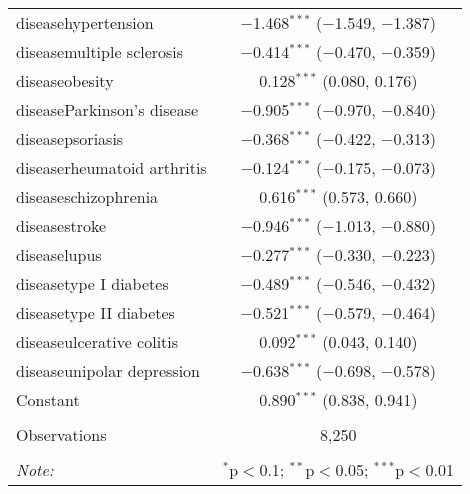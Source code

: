 \begin{table}[!htbp]
\begin{tabular}{@{\extracolsep{5pt}}lc}
  diseasehypertension & $-$1.468$^{***}$ ($-$1.549, $-$1.387) \\ 
  diseasemultiple sclerosis & $-$0.414$^{***}$ ($-$0.470, $-$0.359) \\ 
  diseaseobesity & 0.128$^{***}$ (0.080, 0.176) \\ 
  diseaseParkinson's disease & $-$0.905$^{***}$ ($-$0.970, $-$0.840) \\ 
  diseasepsoriasis & $-$0.368$^{***}$ ($-$0.422, $-$0.313) \\ 
  diseaserheumatoid arthritis & $-$0.124$^{***}$ ($-$0.175, $-$0.073) \\ 
  diseaseschizophrenia & 0.616$^{***}$ (0.573, 0.660) \\ 
  diseasestroke & $-$0.946$^{***}$ ($-$1.013, $-$0.880) \\ 
  diseaselupus & $-$0.277$^{***}$ ($-$0.330, $-$0.223) \\ 
  diseasetype I diabetes & $-$0.489$^{***}$ ($-$0.546, $-$0.432) \\ 
  diseasetype II diabetes & $-$0.521$^{***}$ ($-$0.579, $-$0.464) \\ 
  diseaseulcerative colitis & 0.092$^{***}$ (0.043, 0.140) \\ 
  diseaseunipolar depression & $-$0.638$^{***}$ ($-$0.698, $-$0.578) \\ 
  Constant & 0.890$^{***}$ (0.838, 0.941) \\ 
 \hline \\[-1.8ex] 
Observations & 8,250 \\ 
\hline 
\hline \\[-1.8ex] 
\textit{Note:}  & \multicolumn{1}{r}{$^{*}$p$<$0.1; $^{**}$p$<$0.05; $^{***}$p$<$0.01} \\ 
\end{tabular} 
\end{table} 
